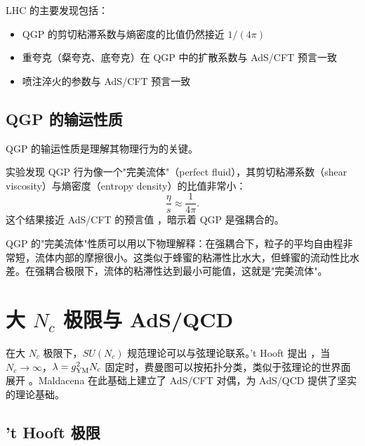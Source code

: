 \begin{property}
LHC 的主要发现包括：
\begin{itemize}
    \item QGP 的剪切粘滞系数与熵密度的比值仍然接近 $1/(4\pi)$
    \item 重夸克（粲夸克、底夸克）在 QGP 中的扩散系数与 AdS/CFT 预言一致
    \item 喷注淬火的参数与 AdS/CFT 预言一致
\end{itemize}
\end{property}

\subsection{QGP 的输运性质}

QGP 的输运性质是理解其物理行为的关键。

\begin{proposition}
实验发现 QGP 行为像一个"完美流体"（perfect fluid），其剪切粘滞系数（shear viscosity）与熵密度（entropy density）的比值非常小：
\begin{equation}
    \frac{\eta}{s} \approx \frac{1}{4\pi}.
\end{equation}
这个结果接近 AdS/CFT 的预言值 \cite{Policastro2001}，暗示着 QGP 是强耦合的。
\end{proposition}

\begin{remark}
QGP 的"完美流体"性质可以用以下物理解释：在强耦合下，粒子的平均自由程非常短，流体内部的摩擦很小。这类似于蜂蜜的粘滞性比水大，但蜂蜜的流动性比水差。在强耦合极限下，流体的粘滞性达到最小可能值，这就是"完美流体"。
\end{remark}

\section{大 $N_c$ 极限与 AdS/QCD}

在大 $N_c$ 极限下，$SU(N_c)$ 规范理论可以与弦理论联系。't Hooft 提出 \cite{tHooft1974}，当 $N_c \to \infty$，$\lambda = g_{\rm YM}^2 N_c$ 固定时，费曼图可以按拓扑分类，类似于弦理论的世界面展开 \cite{Polchinski1998}。Maldacena \cite{Maldacena1998} 在此基础上建立了 AdS/CFT 对偶，为 AdS/QCD 提供了坚实的理论基础。

\subsection{'t Hooft 极限}

